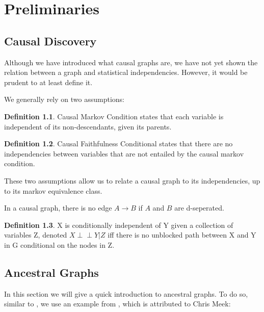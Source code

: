 \documentclass[11pt,a4paper]{report}
\theoremstyle{definition}
\newtheorem{defn}{Definition}[section]
\def\ci{\perp\!\!\!\perp}
\begin{document}
\chapter{Preliminaries}\label{preliminaries}



\section{Causal Discovery}\label{sec:causal_discovery}
Although we have introduced what causal graphs are, we have not yet shown
the relation between a graph and statistical independencies. However, it
would be prudent to at least define it.

We generally rely on two assumptions:

\begin{defn}
  Causal Markov Condition states that each variable is independent of its
  non-descendants, given its parents.
\end{defn}

\begin{defn}
  Causal Faithfulness Conditional states that there are no independencies
  between variables that are not entailed by the causal markov condition.
\end{defn}

These two assumptions allow us to relate a causal graph to its
independencies, up to its markov equivalence class.

In a causal graph, there is no edge $A \rightarrow B$ if $A$ and $B$ are
d-seperated.

\begin{defn}
  X is conditionally independent of Y given a collection of variables Z,
  denoted $X \ci Y | Z$ iff there is no unblocked path between X and Y in
  G conditional on the nodes in Z.
\end{defn}



\section{Ancestral Graphs}
In this section we will give a quick introduction to ancestral graphs.  To
do so, similar to \cite{zhangCompletenessOrientationRules2008}, we use an
example from \cite{richardsonChainGraphsSymmetric1998}, which is
attributed to Chris Meek:
\end{document}
